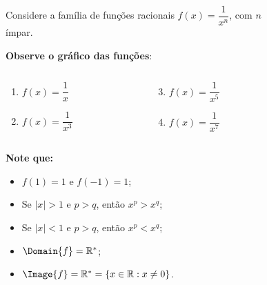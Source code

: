 \begin{frame}
  \begin{columns}[onlytextwidth]
    \begin{column}{0.49\textwidth}
      \vspace*{-0.35cm}
      \begin{example}
        Considere a família de funções racionais $f(x)=\dfrac{1}{x^{n}}$, com $n$ ímpar.
      \end{example}
      \textbf{Observe o gráfico das funções}:
      \vspace*{-0.5cm}
      \begin{columns}[onlytextwidth]
        \begin{column}{0.5\textwidth}
          \begin{enumerate}
            \item< 1- > $f(x)=\dfrac{1}{x}$
            \item< 2- > $f(x)=\dfrac{1}{x^{3}}$
          \end{enumerate}
        \end{column}
        \begin{column}{0.5\textwidth}
          \begin{enumerate}
            \setcounter{enumi}{2}
            \item< 3- > $f(x)=\dfrac{1}{x^{5}}$
            \item< 4- > $f(x)=\dfrac{1}{x^{7}}$
          \end{enumerate}
        \end{column}
      \end{columns}
      \vspace*{0.35cm}
      \begin{highlight}
        \textbf{Note que:}
        \begin{itemize}
          \item< 1- > $f(1) = 1$ e $f(-1)=1$;
          \item< 4- > Se $|x| > 1$ e $p>q$, então $x^{p} > x^{q}$;
          \item< 4- > Se $|x| < 1$ e $p>q$, então $x^{p} < x^{q}$;
          \item< 4- > $\Domain{f}=\mathbb{R}^{*}$;
          \item< 4- > $\Image{f}=\mathbb{R}^{*} = \left\{x\in\mathbb{R}:x \not= 0\right\}$.
        \end{itemize}
      \end{highlight}
    \end{column}
    \begin{column}{0.49\textwidth}
        \begin{figure}
      \end{figure}
    \end{column}
  \end{columns}
\end{frame}